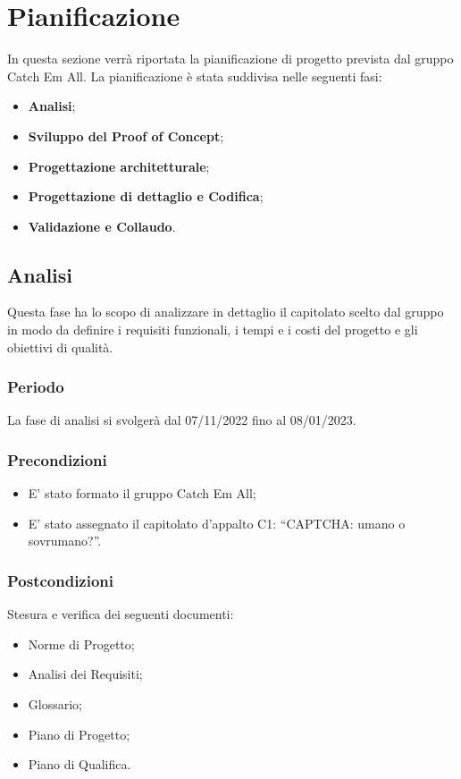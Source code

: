 \section{Pianificazione}
In questa sezione verrà riportata la pianificazione di progetto prevista dal gruppo Catch Em All. La pianificazione è stata suddivisa nelle seguenti fasi:
\begin{itemize}
	\item \textbf{Analisi};
	\item \textbf{Sviluppo del Proof of Concept};
	\item \textbf{Progettazione architetturale};
    \item \textbf{Progettazione di dettaglio e Codifica};
	\item \textbf{Validazione e Collaudo}.
\end{itemize}

\subsection{Analisi}
Questa fase ha lo scopo di analizzare in dettaglio il capitolato scelto dal gruppo in modo da definire i requisiti funzionali, i tempi e i costi del progetto e gli obiettivi di qualità.

\subsubsection{Periodo}
La fase di analisi si svolgerà dal 07/11/2022 fino al 08/01/2023.

\subsubsection{Precondizioni}
\begin{itemize}
	\item E’ stato formato il gruppo Catch Em All;
	\item E’ stato assegnato il capitolato d’appalto C1: “CAPTCHA: umano o sovrumano?”.
\end{itemize}

\subsubsection{Postcondizioni}
Stesura e verifica dei seguenti documenti:
\begin{itemize}
	\item Norme di Progetto;
	\item Analisi dei Requisiti;
	\item Glossario;
    \item Piano di Progetto;
	\item Piano di Qualifica.
\end{itemize}

